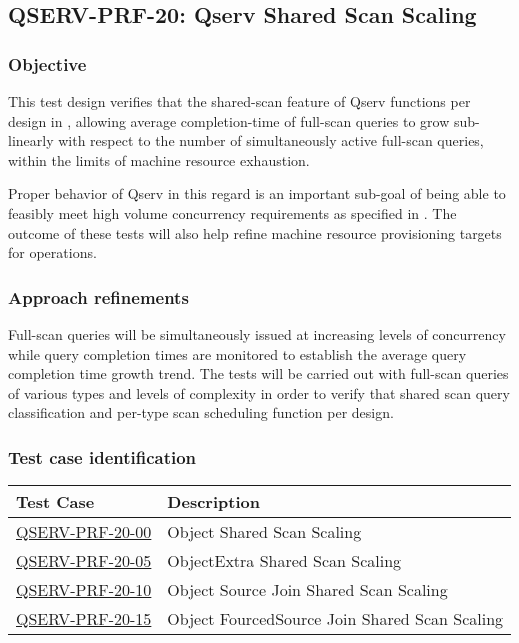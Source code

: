 \subsection{\textsc{QSERV-PRF-20}: Qserv Shared Scan Scaling}
\label{qserv-prf-20}

\subsubsection{Objective}

This test design verifies that the shared-scan feature of Qserv functions per design in ,
allowing average completion-time of full-scan queries to grow sub-linearly with respect to the number of
simultaneously active full-scan queries, within the limits of machine resource exhaustion.

Proper behavior of Qserv in this regard is an important sub-goal of being able to feasibly meet high
volume concurrency requirements as specified in .  The outcome of these tests will also
help refine machine resource provisioning targets for operations.

\subsubsection{Approach refinements}

Full-scan queries will be simultaneously issued at increasing levels of concurrency while query
completion times are monitored to establish the average query completion time growth trend.  The
tests will be carried out with full-scan queries of various types and levels of complexity in order
to verify that shared scan query classification and per-type scan scheduling function per design.

\subsubsection{Test case identification}

\begin{longtable} {|p{}|p{}|}\hline
\textbf{Test Case}  & \textbf{Description} \\\hline
\hyperref[qserv-prf-20-00]{\textsc{QSERV-PRF-20-00}} & Object Shared Scan Scaling \\\hline
\hyperref[qserv-prf-20-05]{\textsc{QSERV-PRF-20-05}} & ObjectExtra Shared Scan Scaling \\\hline
\hyperref[qserv-prf-20-10]{\textsc{QSERV-PRF-20-10}} & Object Source Join Shared Scan Scaling \\\hline
\hyperref[qserv-prf-20-15]{\textsc{QSERV-PRF-20-15}} & Object FourcedSource Join Shared Scan Scaling \\\hline
\end{longtable}
